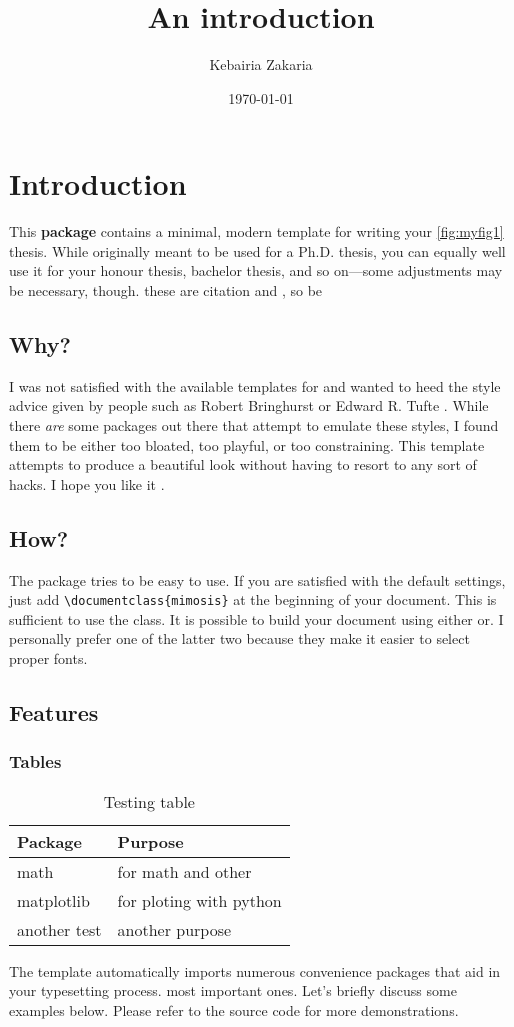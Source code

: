 \documentclass{tufte-org}
\author{Kebairia Zakaria}
\date{\today}
\title{An introduction}
\begin{document}
 
\frontmatter
\glsenablehyper
\tableofcontents
\mainmatter


\section{Introduction}
\label{sec:org2ce1b0d}
This \textbf{package} contains a minimal, modern template for writing your \autoref{fig:myfig1}
thesis. While originally meant to be used for a Ph.D. thesis, you can
equally well use it for your honour thesis, bachelor thesis, and so
on---some adjustments may be necessary, though.
these are citation \cite{Laramee11,Laramee10} and \cite{Edelsbrunner02}, \cite{Edelsbrunner10}
so be \autocite{Tufte01}
\subsection{Why?}
\label{sec:orgefc455f}
I was not satisfied with the available templates for and wanted
to heed the style advice given by people such as Robert Bringhurst \cite{Bringhurst12} or Edward R.
Tufte \cite{Tufte90,Tufte01} . While there \emph{are} some packages out 
there that attempt to emulate these styles, I found them to be either
too bloated, too playful, or too constraining. This template attempts to
produce a beautiful look without having to resort to any sort of hacks.
I hope you like it \cite{nikouei19:_i_safe}.

\subsection{How?}
\label{sec:org49b44f6}
The package tries to be easy to use. If you are satisfied with the
default settings, just add \texttt{\textbackslash{}documentclass\{mimosis\}} at the beginning of your document.
This is sufficient to use the class.
It is possible to build your document using either  or. I personally prefer one of the latter two because they make
it easier to select proper fonts.
\subsection{Features}
\label{sec:org04db2b3}
\subsubsection{Tables}
\label{sec:org60e449b}

\begin{table}[htbp]
\caption{\label{table1}Testing table}
\centering
\begin{tabular}{ll}
\toprule
\textbf{Package} & \textbf{Purpose}\\
\midrule
math & for math and other\\
matplotlib & for ploting with python\\
another test & another purpose\\
\bottomrule
\end{tabular}
\end{table}
The template automatically imports numerous convenience packages that
aid in your typesetting process.
most important ones. Let's briefly discuss some examples below. Please
refer to the source code for more demonstrations.
\end{document}
